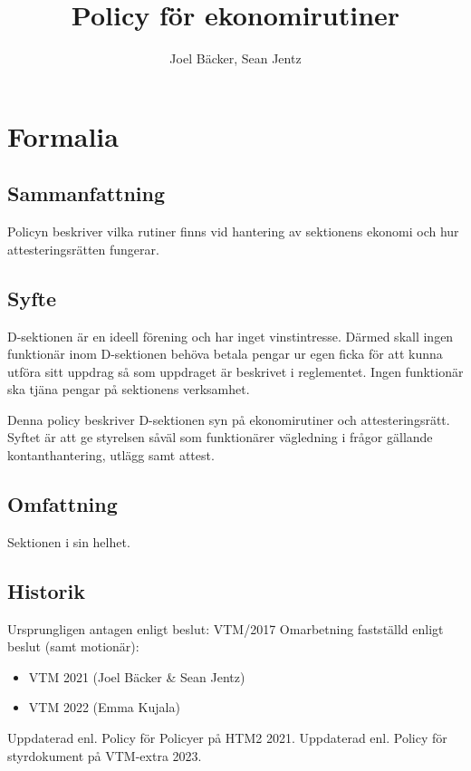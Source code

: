 \documentclass{dsekprotokoll}
\title{Policy för ekonomirutiner}
\author{Joel Bäcker, Sean Jentz}
\begin{document}
\maketitle
\section{Formalia}
\subsection{Sammanfattning}
Policyn beskriver vilka rutiner finns vid hantering av sektionens ekonomi och hur attesteringsrätten fungerar.
\subsection{Syfte}
D-sektionen är en ideell förening och har inget vinstintresse. Därmed skall ingen funktionär inom D-sektionen behöva betala pengar ur egen ficka för att kunna utföra sitt uppdrag så som uppdraget är beskrivet i reglementet. Ingen funktionär ska tjäna pengar på sektionens verksamhet.

\par Denna policy beskriver D-sektionen syn på ekonomirutiner och attesteringsrätt. Syftet är att ge styrelsen såväl som funktionärer vägledning i frågor gällande kontanthantering, utlägg samt attest.
\subsection{Omfattning}
Sektionen i sin helhet.
\subsection{Historik}
Ursprungligen antagen enligt beslut: VTM/2017
Omarbetning fastställd enligt beslut (samt motionär):
\begin{itemize}
\item VTM 2021 (Joel Bäcker \& Sean Jentz)
\item VTM 2022 (Emma Kujala)
\end{itemize}
Uppdaterad enl. Policy för Policyer på HTM2 2021. Uppdaterad enl. Policy för styrdokument på VTM-extra 2023.



\end{document}
